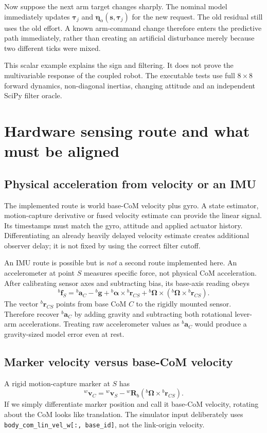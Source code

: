 \documentclass[11pt,a4paper]{article}
\newcommand{\vct}[1]{\boldsymbol{#1}}
\newcommand{\mat}[1]{\mathbf{#1}}
\newcommand{\bv}[1]{{}^{b}\vct{#1}}
\newcommand{\wv}[1]{{}^{w}\vct{#1}}
\newcommand{\Rw}{{}^{w}\mat R_b}
\begin{document}
Now suppose the next arm target changes sharply. The nominal model immediately
updates $\vct\tau_j$ and $\vct\eta_\alpha(\vct s,\vct\tau_j)$ for the new
request. The old residual still uses the old effort. A known arm-command change
therefore enters the predictive path immediately, rather than creating an
artificial disturbance merely because two different ticks were mixed.

This scalar example explains the sign and filtering. It does not prove the
multivariable response of the coupled robot. The executable tests use full
$8\times8$ forward dynamics, non-diagonal inertias, changing attitude and an
independent SciPy filter oracle.

\section{Hardware sensing route and what must be aligned}\label{sec:sensors}

\subsection{Physical acceleration from velocity or an IMU}
The implemented route is world base-CoM velocity plus gyro. A state estimator,
motion-capture derivative or fused velocity estimate can provide the linear
signal. Its timestamps must match the gyro, attitude and applied actuator
history. Differentiating an already heavily delayed velocity estimate creates
additional observer delay; it is not fixed by using the correct filter cutoff.

An IMU route is possible but is \emph{not} a second route implemented here.
An accelerometer at point $S$ measures specific force, not physical CoM
acceleration. After calibrating sensor axes and subtracting bias, its base-axis
reading obeys
\begin{equation}
\bv f_S=\bv a_C-\bv g
+\bv\alpha\times\bv r_{CS}
+\bv\Omega\times(\bv\Omega\times\bv r_{CS}).
\label{eq:imu}
\end{equation}
The vector $\bv r_{CS}$ points from base CoM $C$ to the rigidly mounted sensor.
Therefore recover $\bv a_C$ by adding gravity and subtracting both rotational
lever-arm accelerations. Treating raw accelerometer values as $\bv a_C$ would
produce a gravity-sized model error even at rest.

\subsection{Marker velocity versus base-CoM velocity}
A rigid motion-capture marker at $S$ has
\begin{equation}
\wv v_C=\wv v_S-\Rw\left(\bv\Omega\times\bv r_{CS}\right).
\label{eq:marker}
\end{equation}
If we simply differentiate marker position and call it base-CoM velocity,
rotating about the CoM looks like translation. The simulator input deliberately
uses \texttt{body\_com\_lin\_vel\_w[:, base\_id]}, not the link-origin velocity.
\end{document}
